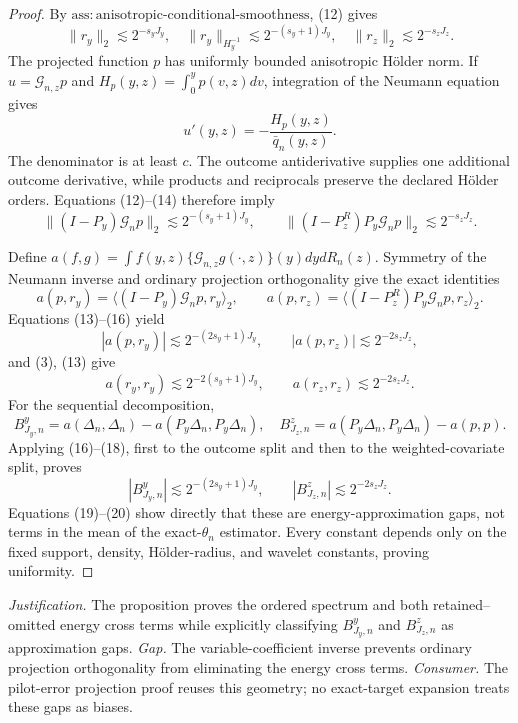 \documentclass{article}
\begin{document}
\begin{proof}
By \(\mathrm{ass{:}anisotropic\text{-}conditional\text{-}smoothness}\), (12) gives
\[
\|r_y\|_2\lesssim2^{-s_yJ_y},
\quad \|r_y\|_{H_y^{-1}}\lesssim2^{-(s_y+1)J_y},
\quad \|r_z\|_2\lesssim2^{-s_zJ_z}.                            \tag{13}
\]
The projected function \(p\) has uniformly bounded anisotropic H\"older norm. If \(u=\mathcal G_{n,z}p\) and \(H_p(y,z)=\int_0^yp(v,z)dv\), integration of the Neumann equation gives
\[
u'(y,z)=-\frac{H_p(y,z)}{\bar q_n(y,z)}.                         \tag{14}
\]
The denominator is at least \(c\). The outcome antiderivative supplies one additional outcome derivative, while products and reciprocals preserve the declared H\"older orders. Equations (12)--(14) therefore imply
\[
\|(I-P_y)\mathcal G_np\|_2\lesssim2^{-(s_y+1)J_y},
\qquad
\|(I-P_z^R)P_y\mathcal G_np\|_2\lesssim2^{-s_zJ_z}.            \tag{15}
\]

Define \(a(f,g)=\int f(y,z)\{\mathcal G_{n,z}g(\cdot,z)\}(y)dydR_n(z)\). Symmetry of the Neumann inverse and ordinary projection orthogonality give the exact identities
\[
a(p,r_y)=\langle(I-P_y)\mathcal G_np,r_y\rangle_2,
\qquad
a(p,r_z)=\langle(I-P_z^R)P_y\mathcal G_np,r_z\rangle_2.          \tag{16}
\]
Equations (13)--(16) yield
\[
|a(p,r_y)|\lesssim2^{-(2s_y+1)J_y},
\qquad |a(p,r_z)|\lesssim2^{-2s_zJ_z},                           \tag{17}
\]
and (3), (13) give
\[
a(r_y,r_y)\lesssim2^{-2(s_y+1)J_y},
\qquad a(r_z,r_z)\lesssim2^{-2s_zJ_z}.                           \tag{18}
\]
For the sequential decomposition,
\[
B^y_{J_y,n}=a(\Delta_n,\Delta_n)-a(P_y\Delta_n,P_y\Delta_n),
\quad
B^z_{J_z,n}=a(P_y\Delta_n,P_y\Delta_n)-a(p,p).                   \tag{19}
\]
Applying (16)--(18), first to the outcome split and then to the weighted-covariate split, proves
\[
|B^y_{J_y,n}|\lesssim2^{-(2s_y+1)J_y},
\qquad |B^z_{J_z,n}|\lesssim2^{-2s_zJ_z}.                        \tag{20}
\]
Equations (19)--(20) show directly that these are energy-approximation gaps, not terms in the mean of the exact-\(\theta_n\) estimator. Every constant depends only on the fixed support, density, H\"older-radius, and wavelet constants, proving uniformity.
\end{proof}
\par\smallskip\noindent \textit{Justification.} The proposition proves the ordered spectrum and both retained--omitted energy cross terms while explicitly classifying \(B^y_{J_y,n}\) and \(B^z_{J_z,n}\) as approximation gaps. \textit{Gap.} The variable-coefficient inverse prevents ordinary projection orthogonality from eliminating the energy cross terms. \textit{Consumer.} The pilot-error projection proof reuses this geometry; no exact-target expansion treats these gaps as biases.
\end{document}
